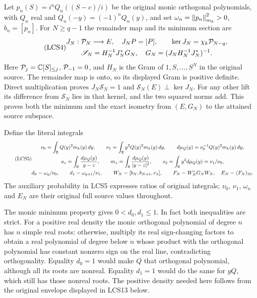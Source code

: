 Let $p_n(S)=i^nQ_n((S-c)/i)$ be the original monic orthogonal
polynomials, with $Q_n$ real and
$Q_n(-y)=(-1)^nQ_n(y)$, and set
$\omega_n=\left\lVert p_n\right\rVert_{m_k}^2>0$, $b_n=[p_n]$.
For $N\ge q-1$ the remainder map and its minimum section are
\begin{equation}\tag{LCS4}
\begin{gathered}
 J_N:\mathcal P_N\longrightarrow E,\quad J_NP=[P],\qquad
 \ker J_N=\chi_k\mathcal P_{N-q},\\
 \mathscr S_N=H_N^{-1}J_N^*G_N,\quad
 G_N=(J_NH_N^{-1}J_N^*)^{-1}.
\end{gathered}
\end{equation}
Here $\mathcal P_j=\mathbb C[S]_{\le j}$, $\mathcal P_{-1}=0$, and $H_N$ is the
Gram of $1,S,\ldots,S^N$ in the original source. The remainder map
is onto, so its displayed Gram is positive definite. Direct
multiplication proves $J_N\mathscr S_N=1$ and
$\mathscr S_N(E)\perp\ker J_N$. For any other lift its difference
from $\mathscr S_N$ lies in that kernel, and the two squared norms
add. This proves both the minimum and the exact isometry from
$(E,G_N)$ to the attained source subspace.

Define the literal integrals
\begin{equation}\tag{LCS5}
\begin{gathered}
 \nu_0=\int_\mathbb R Q(y)^2m_k(y)\,dy,\qquad
 \nu_1=\int_\mathbb R y^2Q(y)^2m_k(y)\,dy,\qquad
 d\mu_Q(y)=\nu_0^{-1}Q(y)^2m_k(y)\,dy,\\
 a_z=\int_\mathbb R\frac{d\mu_Q(y)}{y-z},\qquad
 m_z=\int_\mathbb R\frac{d\mu_Q(y)}{|y-z|^2},\qquad
 s_2=\int_\mathbb R y^2d\mu_Q(y)=\nu_1/\nu_0,\\
 d_0=\omega_q/\nu_0,\qquad d_1=\omega_{q+1}/\nu_1,\qquad
 W_N=[b_N,b_{N+1},v_\lambda],\qquad
 F_N=W_N^*G_NW_N,\quad E_N=(F_N)_{33}.
\end{gathered}
\end{equation}
The auxiliary probability in LCS5 expresses ratios of original
integrals; $\nu_0$, $\nu_1$, $\omega_n$ and $E_N$ are their original
full source values throughout.

The monic minimum property gives $0<d_0,d_1\le1$. In fact both
inequalities are strict. For a positive real density the monic
orthogonal polynomial of degree $n$ has $n$ simple real roots:
otherwise, multiply its real sign-changing factors to obtain a
real polynomial of degree below $n$ whose product with the
orthogonal polynomial has constant nonzero sign on the real line,
contradicting orthogonality. Equality $d_0=1$ would make $Q$ that
orthogonal polynomial, although all its roots are nonreal.
Equality $d_1=1$ would do the same for $yQ$, which still has those
nonreal roots. The positive density needed here follows from the
original envelope displayed in LCS13 below.

